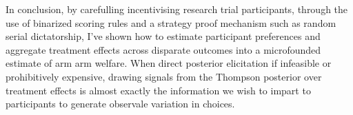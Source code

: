 \documentclass[twoside,11pt]{article}
\begin{document}
In conclusion, by carefulling incentivising research trial participants, through the 
use of binarized scoring rules and a strategy proof mechanism such as 
random serial dictatorship, I've shown how to estimate participant preferences
and aggregate treatment effects across disparate outcomes into a microfounded 
estimate of arm arm welfare. When direct posterior elicitation if infeasible or 
prohibitively expensive, drawing signals from the Thompson posterior over treatment 
effects is almost exactly the information we wish to impart to participants 
to generate observale variation in choices.



\newpage


\vskip 0.2in

\end{document}
